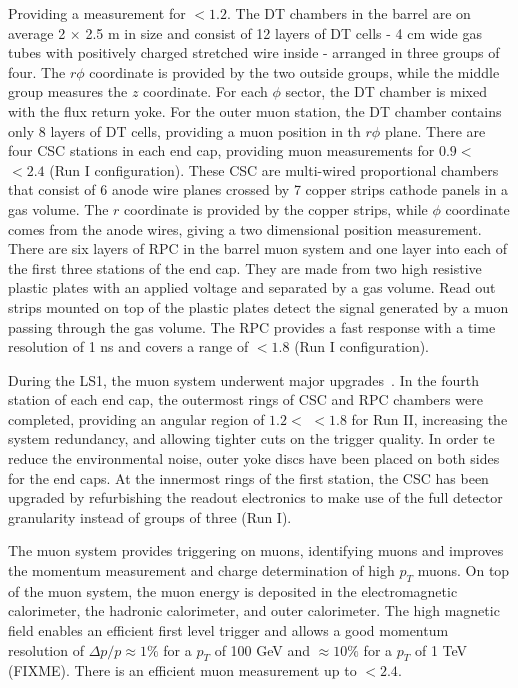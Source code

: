 Providing a measurement for \abspsrap $<1.2$. The DT chambers in the barrel are on average 2 $\times$ 2.5 \si{ \meter} in size and consist of 12 layers of DT cells - 4 \si{ \centi \meter} wide gas tubes with positively charged stretched wire inside - arranged in three groups of four. The $r\phi$ coordinate is provided by the two outside groups, while the middle group measures the $z$ coordinate. For each $\phi$ sector, the DT chamber is mixed with the flux return yoke. For the outer muon station, the DT chamber contains only 8 layers of DT cells, providing a muon position in th $r\phi$ plane.
There are four CSC stations in each end cap, providing muon measurements for $0.9<$ \abspsrap $<2.4$ (Run I configuration). These CSC are multi-wired proportional chambers that consist of 6 anode wire planes crossed by 7 copper strips cathode panels in a gas volume. The $r$ coordinate is provided by the copper strips, while $\phi$ coordinate comes from the anode wires, giving a two dimensional position measurement. 
There are six layers of RPC in the barrel muon system and one layer into each of the first three stations of the end cap. They are made from two high resistive plastic plates with an applied voltage and separated by a gas volume. Read out strips mounted on top of the plastic plates detect the signal generated by a muon passing through the gas volume. The RPC provides a fast response with a time resolution of 1 \si{ \nano \second} and covers a range of \abspsrap $<1.8$ (Run I configuration). 


During the LS1, the  muon system underwent major upgrades~\cite{Guiducci:1966038,Battilana:2239185}. In the fourth station of each end cap, the outermost rings of CSC and RPC chambers were completed, providing an angular region of $1.2<$ \abspsrap $<1.8$ for Run II, increasing the system redundancy, and allowing tighter cuts on the trigger quality. In order te reduce the environmental noise, outer yoke discs have been placed on both sides for the end caps. 
At the innermost rings of the first station, the CSC has been upgraded by refurbishing the readout electronics to make use of the full detector granularity instead of groups of three (Run I). 

The muon system provides triggering on muons, identifying muons and improves the momentum measurement and charge determination of high $p_T$ muons. On top of the muon system, the muon energy is deposited in the electromagnetic calorimeter, the hadronic calorimeter, and outer calorimeter. 
The high magnetic field enables an efficient first level trigger and allows a good momentum resolution of $\Delta p / p \approx 1\%$ for a $p_T$ of 100 \si{ \GeV} and $\approx 10\%$ for a $p_T$ of 1 \si{ \TeV} (FIXME). There is an efficient muon measurement up to \abspsrap $<2.4$.
